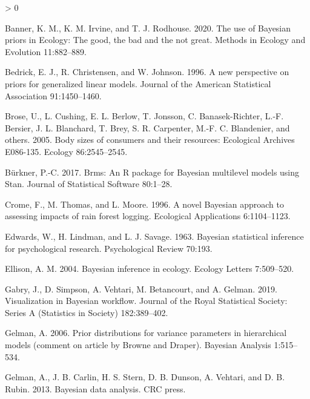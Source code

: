 \documentclass[
  12pt,
]{article}
\newlength{\cslhangindent}
\newenvironment{CSLReferences}[2] %
 {%
  \setlength{\parindent}{0pt}
  \ifodd #1 \everypar{\setlength{\hangindent}{\cslhangindent}}\ignorespaces\fi
  \ifnum #2 > 0
  \setlength{\parskip}{#2\baselineskip}
  \fi
 }%
 {}
\begin{document}
\hypertarget{refs}{}
\begin{CSLReferences}{1}{0}
\leavevmode\hypertarget{ref-banner_use_2020}{}%
Banner, K. M., K. M. Irvine, and T. J. Rodhouse. 2020. The use of
{Bayesian} priors in {Ecology}: {The} good, the bad and the not great.
Methods in Ecology and Evolution 11:882--889.

\leavevmode\hypertarget{ref-bedrick_new_1996}{}%
Bedrick, E. J., R. Christensen, and W. Johnson. 1996. A new perspective
on priors for generalized linear models. Journal of the American
Statistical Association 91:1450--1460.

\leavevmode\hypertarget{ref-brose_body_2005}{}%
Brose, U., L. Cushing, E. L. Berlow, T. Jonsson, C. Banasek-Richter,
L.-F. Bersier, J. L. Blanchard, T. Brey, S. R. Carpenter, M.-F. C.
Blandenier, and others. 2005. Body sizes of consumers and their
resources: {Ecological} {Archives} {E086}-135. Ecology 86:2545--2545.

\leavevmode\hypertarget{ref-burkner_brms_2017}{}%
Bürkner, P.-C. 2017. Brms: {An} {R} package for {Bayesian} multilevel
models using {Stan}. Journal of Statistical Software 80:1--28.

\leavevmode\hypertarget{ref-crome_novel_1996}{}%
Crome, F., M. Thomas, and L. Moore. 1996. A novel {Bayesian} approach to
assessing impacts of rain forest logging. Ecological Applications
6:1104--1123.

\leavevmode\hypertarget{ref-edwards_bayesian_1963}{}%
Edwards, W., H. Lindman, and L. J. Savage. 1963. Bayesian statistical
inference for psychological research. Psychological Review 70:193.

\leavevmode\hypertarget{ref-ellison_bayesian_2004}{}%
Ellison, A. M. 2004. Bayesian inference in ecology. Ecology Letters
7:509--520.

\leavevmode\hypertarget{ref-gabry_visualization_2019}{}%
Gabry, J., D. Simpson, A. Vehtari, M. Betancourt, and A. Gelman. 2019.
Visualization in {Bayesian} workflow. Journal of the Royal Statistical
Society: Series A (Statistics in Society) 182:389--402.

\leavevmode\hypertarget{ref-gelman_prior_2006}{}%
Gelman, A. 2006. Prior distributions for variance parameters in
hierarchical models (comment on article by {Browne} and {Draper}).
Bayesian Analysis 1:515--534.

\leavevmode\hypertarget{ref-gelman_bayesian_2013}{}%
Gelman, A., J. B. Carlin, H. S. Stern, D. B. Dunson, A. Vehtari, and D.
B. Rubin. 2013. Bayesian data analysis. CRC press.


\end{CSLReferences}
\end{document}
